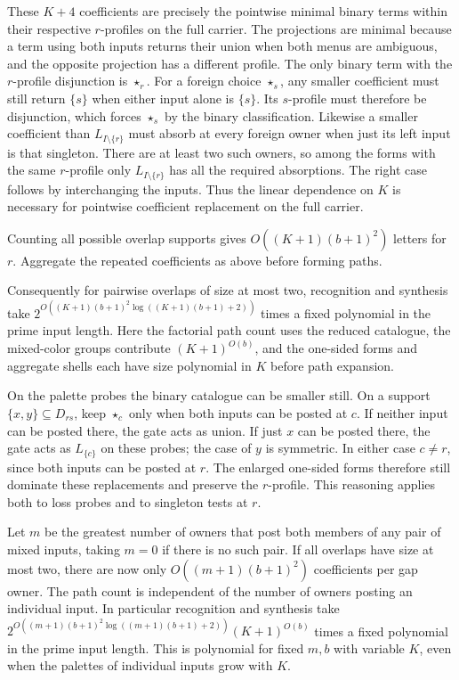 These $K+4$ coefficients are precisely the pointwise
minimal binary terms within their respective $r$-profiles
on the full carrier. The projections are minimal because
a term using both inputs returns their union when both
menus are ambiguous, and the opposite projection has a
different profile. The only binary term with the
$r$-profile disjunction is $\star_r$. For a foreign choice
$\star_s$, any smaller coefficient must still return
$\{s\}$ when either input alone is $\{s\}$. Its $s$-profile
must therefore be disjunction, which forces $\star_s$
by the binary classification. Likewise a smaller
coefficient than $L_{I\setminus\{r\}}$ must absorb at
every foreign owner when just its left input is that
singleton. There are at least two such owners, so among
the forms with the same $r$-profile only
$L_{I\setminus\{r\}}$ has all the required absorptions.
The right case follows by interchanging the inputs.
Thus the linear dependence on $K$ is necessary for
pointwise coefficient replacement on the full carrier.

Counting all possible overlap supports gives
$O((K+1)(b+1)^2)$ letters for $r$. Aggregate the repeated
coefficients as above before forming paths.

Consequently for pairwise overlaps of size at most two,
recognition and synthesis take
$2^{O((K+1)(b+1)^2\log((K+1)(b+1)+2))}$
times a fixed polynomial in the prime input length.
Here the factorial path count uses the reduced catalogue,
the mixed-color groups contribute $(K+1)^{O(b)}$, and
the one-sided forms and aggregate shells each have
size polynomial in $K$ before path expansion.

On the palette probes the binary catalogue can be
smaller still. On a support $\{x,y\}\subseteq D_{rs}$,
keep $\star_c$ only when both inputs can be posted at
$c$. If neither input can be posted there, the gate acts
as union. If just $x$ can be posted there, the gate acts
as $L_{\{c\}}$ on these probes; the case of $y$ is
symmetric. In either case $c\ne r$, since both inputs
can be posted at $r$. The enlarged one-sided forms
therefore still dominate these replacements and preserve
the $r$-profile. This reasoning applies both to loss probes
and to singleton tests at $r$.

Let $m$ be the greatest number of owners that post both
members of any pair of mixed inputs, taking $m=0$ if
there is no such pair. If all overlaps have size at most
two, there are now only $O((m+1)(b+1)^2)$ coefficients per
gap owner. The path count is independent of the number
of owners posting an individual input. In particular
recognition and synthesis take
$2^{O((m+1)(b+1)^2\log((m+1)(b+1)+2))}(K+1)^{O(b)}$
times a fixed polynomial in the prime input length.
This is polynomial for fixed $m,b$ with variable $K$,
even when the palettes of individual inputs grow with $K$.

